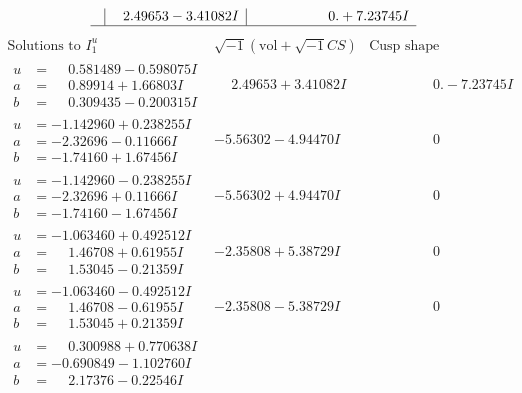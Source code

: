 \documentclass[1p]{elsarticle_modified}
\theoremstyle{definition}
\newcommand{\I}{\sqrt{-1}}
\begin{document}
$$\begin{array}{c|c|c}
 & \phantom{-}2.49653 - 3.41082 I & \phantom{-0.000000 -}0. + 7.23745 I\\
 \hline 
 \end{array}$$\newpage$$\begin{array}{c|c|c}  
\text{Solutions to }I^u_{1}& \I (\text{vol} + \sqrt{-1}CS) & \text{Cusp shape}\\
 \hline 
\begin{aligned}
u &= \phantom{-}0.581489 - 0.598075 I \\
a &= \phantom{-}0.89914 + 1.66803 I \\
b &= \phantom{-}0.309435 - 0.200315 I\end{aligned}
 & \phantom{-}2.49653 + 3.41082 I & \phantom{-0.000000 } 0. - 7.23745 I \\ \hline\begin{aligned}
u &= -1.142960 + 0.238255 I \\
a &= -2.32696 - 0.11666 I \\
b &= -1.74160 + 1.67456 I\end{aligned}
 & -5.56302 - 4.94470 I & \phantom{-0.000000 } 0 \\ \hline\begin{aligned}
u &= -1.142960 - 0.238255 I \\
a &= -2.32696 + 0.11666 I \\
b &= -1.74160 - 1.67456 I\end{aligned}
 & -5.56302 + 4.94470 I & \phantom{-0.000000 } 0 \\ \hline\begin{aligned}
u &= -1.063460 + 0.492512 I \\
a &= \phantom{-}1.46708 + 0.61955 I \\
b &= \phantom{-}1.53045 - 0.21359 I\end{aligned}
 & -2.35808 + 5.38729 I & \phantom{-0.000000 } 0 \\ \hline\begin{aligned}
u &= -1.063460 - 0.492512 I \\
a &= \phantom{-}1.46708 - 0.61955 I \\
b &= \phantom{-}1.53045 + 0.21359 I\end{aligned}
 & -2.35808 - 5.38729 I & \phantom{-0.000000 } 0 \\ \hline\begin{aligned}
u &= \phantom{-}0.300988 + 0.770638 I \\
a &= -0.690849 - 1.102760 I \\
b &= \phantom{-}2.17376 - 0.22546 I\end{aligned}

\end{array}$$
\end{document}
